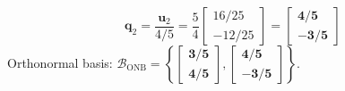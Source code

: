 \begin{enumerate}
\begin{equation*}
    \end{equation*}
    \begin{equation*}
    \mathbf{q}_2 = \frac{\mathbf{u}_2}{4/5} = \frac{5}{4} \begin{bmatrix} 16/25 \\ -12/25 \end{bmatrix} = \mathbf{\begin{bmatrix} 4/5 \\ -3/5 \end{bmatrix}}
    \end{equation*}
    Orthonormal basis: $\mathcal{B}_{\text{ONB}} = \mathbf{\left\{ \begin{bmatrix} 3/5 \\ 4/5 \end{bmatrix}, \begin{bmatrix} 4/5 \\ -3/5 \end{bmatrix} \right\}}$.
\end{enumerate}

